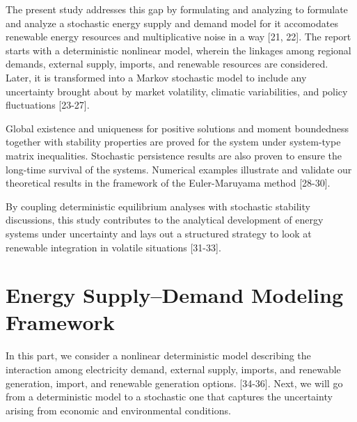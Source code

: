 \documentclass[11pt]{article}
\numberwithin{equation}{section}
\begin{document}
The present study addresses this gap by formulating and analyzing to formulate and analyze a stochastic energy supply and demand model for it accomodates renewable energy resources and multiplicative noise in a way [21, 22]. The report starts with a deterministic nonlinear model, wherein the linkages among regional demands, external supply, imports, and renewable resources are considered. Later, it is transformed into a Markov stochastic model to include any uncertainty brought about by market volatility, climatic variabilities, and policy fluctuations [23-27].

Global existence and uniqueness for positive solutions and moment boundedness together with stability properties are proved for the system under system-type matrix inequalities. Stochastic persistence results are also proven to ensure the long-time survival of the systems. Numerical examples illustrate and validate our theoretical results in the framework of the Euler-Maruyama method [28-30].

By coupling deterministic equilibrium analyses with stochastic stability discussions, this study contributes to the analytical development of energy systems under uncertainty and lays out a structured strategy to look at renewable integration in volatile situations [31-33].


\section{Energy Supply–Demand Modeling Framework}

In this part, we consider a nonlinear deterministic model describing the interaction among electricity demand, external supply, imports, and renewable generation, import, and renewable generation options. [34-36]. Next, we will go from a deterministic model to a stochastic one that captures the uncertainty arising from economic and environmental conditions.
\end{document}
